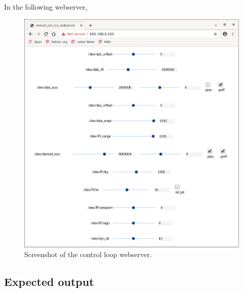 \documentclass[12pt,oneside]{article}
\begin{document}
In the following webserver, 
\vspace{0cm}
\begin{figure}[h!tb]
	\begin{center}
		\vspace{0.5cm}
		\includegraphics[width=15cm,trim={0cm 0cm 0cm 0cm}, clip]{webserver/2020-02-11-154130_889x946_scrot.png}
		\caption{Screenshot of the control loop webserver.}
		\label{fig:pll_webserver}
	\end{center}
\end{figure}
\vspace{0cm}

\subsection{Expected output}
\end{document}
